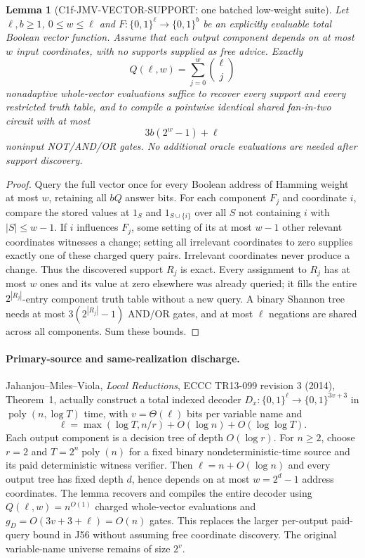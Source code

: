 \documentclass[11pt]{article}
\newtheorem{lemma}{Lemma}
\begin{document}
\begin{lemma}[C1f-JMV-VECTOR-SUPPORT: one batched low-weight suite]
Let $\ell,b\ge1$, $0\le w\le\ell$ and
$F:\{0,1\}^{\ell}\to\{0,1\}^{b}$ be an explicitly evaluable
total Boolean vector function. Assume that \emph{each} output
component depends on at most $w$ input coordinates, with no
supports supplied as free advice. Exactly
\[
Q(\ell,w)=\sum_{j=0}^{w}\binom{\ell}{j}
\]
nonadaptive \emph{whole-vector} evaluations suffice to recover
every support and every restricted truth table, and to compile
a pointwise identical shared fan-in-two circuit with at most
\[
3b(2^w-1)+\ell
\]
noninput NOT/AND/OR gates. No additional oracle evaluations
are needed after support discovery.
\end{lemma}
\begin{proof}
Query the full vector once for every Boolean address of Hamming
weight at most $w$, retaining all $bQ$ answer bits. For each
component $F_j$ and coordinate $i$, compare the stored values at
$1_S$ and $1_{S\cup\{i\}}$ over all $S$ not containing $i$ with
$|S|\le w-1$. If $i$ influences $F_j$, some setting of its at
most $w-1$ other relevant coordinates witnesses a change;
setting all irrelevant coordinates to zero supplies exactly
one of these charged query pairs. Irrelevant coordinates never
produce a change. Thus the discovered support $R_j$ is exact.
Every assignment to $R_j$ has at most $w$ ones and its value
at zero elsewhere was already queried; it fills the entire
$2^{|R_j|}$-entry component truth table without a new query.
A binary Shannon tree needs at most $3(2^{|R_j|}-1)$ AND/OR
gates, and at most $\ell$ negations are shared across all
components. Sum these bounds.
\end{proof}

\paragraph{Primary-source and same-realization discharge.}
Jahanjou--Miles--Viola, \emph{Local Reductions},
ECCC TR13-099 revision 3 (2014), Theorem~1, actually
construct a total indexed decoder
$D_x:\{0,1\}^{\ell}\to\{0,1\}^{3v+3}$ in
$\operatorname{poly}(n,\log T)$ time, with
$v=\Theta(\ell)$ bits per variable name and
\[
\ell=\max(\log T,n/r)+O(\log n)+O(\log\log T).
\]
Each output component is a decision tree of depth
$O(\log r)$. For $n\ge2$, choose $r=2$ and
$T=2^n\operatorname{poly}(n)$ for a fixed binary
nondeterministic-time source and its paid deterministic
witness verifier. Then $\ell=n+O(\log n)$ and every output
tree has fixed depth $d$, hence depends on at most
$w=2^d-1$ address coordinates. The lemma recovers and
compiles the entire decoder using $Q(\ell,w)=n^{O(1)}$
charged whole-vector evaluations and
$g_D=O(3v+3+\ell)=O(n)$ gates. This replaces the larger
per-output paid-query bound in J56 without assuming
free coordinate discovery. The original variable-name
universe remains of size $2^v$.
\end{document}
